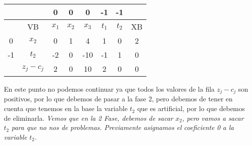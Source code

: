 \begin{itemize}
    \begin{table}[H]
        \centering
        \begin{tabular}{|c|c|c|c|c|c|c|c|}
        \hline
        &  & 0 & 0 & 0 & -1 & -1 &\\
        \hline
        & VB & $x_1$ & $x_2$ & $x_3$ & $t_1$ & $t_2$ & XB \\
        \hline
        0 & $x_2$ & 0 & 1 & 4 & 1 & 0 & 2\\
        \hline
        -1 & $t_2$ & -2 & 0 & -10 & -1& 1 &0\\
        \hline
        & $z_j - c_j$ & 2 & 0& 10 & 2 & 0 &0\\
        \hline
        \end{tabular}
    \end{table}




    En este punto no podemos continuar ya que todos los valores de la fila $z_j - c_j$ son positivos, por lo que debemos de pasar a la fase 2, pero debemos de tener en cuenta que tenemos en la base la variable $t_2$ que es artificial, por lo que debemos de eliminarla. \textit{Vemos que en la 2 Fase, debemos de sacar $x_2$, pero vamos a sacar $t_2$ para que no nos de problemas. Previamente asignamos el coeficiente 0 a la variable $t_2$.}


\end{itemize}
